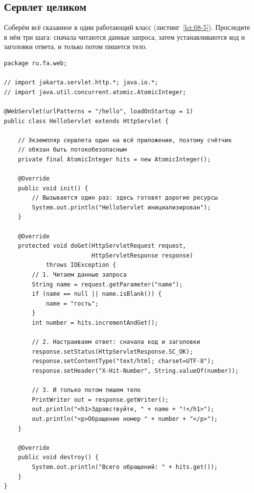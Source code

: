 \subsection{Сервлет целиком}

Соберём всё сказанное в один работающий класс (листинг~\ref{lst:08-5}).
Проследите в нём три шага: сначала читаются данные запроса, затем
устанавливаются код и заголовки ответа, и только потом пишется тело.

\begin{listing}[H]
\begin{verbatim}
package ru.fa.web;

// import jakarta.servlet.http.*; java.io.*;
// import java.util.concurrent.atomic.AtomicInteger;

@WebServlet(urlPatterns = "/hello", loadOnStartup = 1)
public class HelloServlet extends HttpServlet {

    // Экземпляр сервлета один на всё приложение, поэтому счётчик
    // обязан быть потокобезопасным
    private final AtomicInteger hits = new AtomicInteger();

    @Override
    public void init() {
        // Вызывается один раз: здесь готовят дорогие ресурсы
        System.out.println("HelloServlet инициализирован");
    }

    @Override
    protected void doGet(HttpServletRequest request,
                         HttpServletResponse response)
            throws IOException {
        // 1. Читаем данные запроса
        String name = request.getParameter("name");
        if (name == null || name.isBlank()) {
            name = "гость";
        }
        int number = hits.incrementAndGet();

        // 2. Настраиваем ответ: сначала код и заголовки
        response.setStatus(HttpServletResponse.SC_OK);
        response.setContentType("text/html; charset=UTF-8");
        response.setHeader("X-Hit-Number", String.valueOf(number));

        // 3. И только потом пишем тело
        PrintWriter out = response.getWriter();
        out.println("<h1>Здравствуйте, " + name + "!</h1>");
        out.println("<p>Обращение номер " + number + "</p>");
    }

    @Override
    public void destroy() {
        System.out.println("Всего обращений: " + hits.get());
    }
}
\end{verbatim}
\caption{Сервлет-приветствие со счётчиком обращений}
\label{lst:08-5}
\end{listing}

